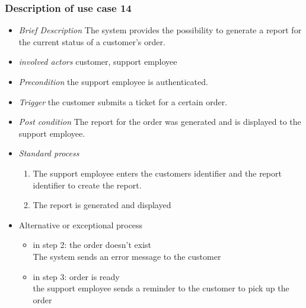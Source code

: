 
\subsubsection{Description of use case 14}
\begin{itemize}
\item \textit{Brief Description} The system provides the possibility to generate a report for the current status of a customer's order.
\item \textit{involved actors} customer, support employee
\item \textit{Precondition} the support employee is authenticated.
\item \textit{Trigger} the customer submits a ticket for a certain order.
\item \textit{Post condition} The report for the order was generated and is displayed to the support employee.
\item \textit{Standard process}
\begin{enumerate}
\item The support employee enters the customers identifier and the report identifier to create the report.
\item The report is generated and displayed
\end{enumerate}
\item Alternative or exceptional process
\begin{itemize}
\item in step 2: the order doesn't exist\\
The system sends an error message to the customer
\item in step 3: order is ready\\
the support employee sends a reminder to the customer to pick up the order
\end{itemize}
\end{itemize}

